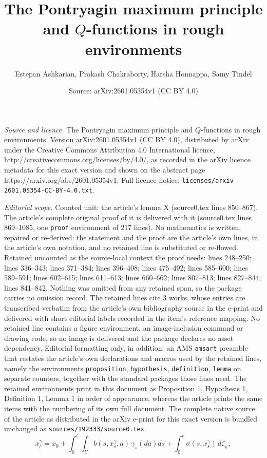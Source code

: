 \documentclass[10pt,a4paper]{amsart}
\title{The Pontryagin maximum principle and $Q$-functions in rough environments}
\author{Estepan Ashkarian, Prakash Chakraborty, Harsha Honnappa, Samy Tindel}
\date{Source: arXiv:2601.05354v1 (CC BY 4.0)}
\newcommand{\ga}{\gamma}
\newcommand{\iot}{\int_{0}^{t}}
\newcommand{\si}{\sigma}
\begin{document}
\maketitle

\noindent\emph{Source and licence.} The Pontryagin maximum principle and $Q$-functions in rough environments. Version arXiv:2601.05354v1 (CC BY 4.0), distributed by arXiv under the Creative Commons Attribution 4.0 International licence, http://creativecommons.org/licenses/by/4.0/, as recorded in the arXiv licence metadata for this exact version and shown on the abstract page https://arxiv.org/abs/2601.05354v1. Full licence notice: \texttt{licenses/arxiv-2601.05354-CC-BY-4.0.txt}.\par\smallskip

\noindent\textit{Editorial scope.} Counted unit: the article's lemma X (source0.tex lines 850--867). The article's complete original proof of it is delivered with it (source0.tex lines 869--1085, one \texttt{proof} environment of 217 lines). No mathematics is written, repaired or re-derived: the statement and the proof are the article's own lines, in the article's own notation, and no retained line is substituted or re-flowed.  Retained uncounted as the source-local context the proof needs: lines 248--250; lines 336--343; lines 371--384; lines 396--408; lines 475--492; lines 585--600; lines 589--591; lines 602--615; lines 611--613; lines 660--662; lines 807--813; lines 827--844; lines 841--842.  Nothing was omitted from any retained span, so the package carries no omission record.  The retained lines cite 3 works, whose entries are transcribed verbatim from the article's own bibliography source in the e-print and delivered with short editorial labels recorded in the item's reference mapping.  No retained line contains a figure environment, an image-inclusion command or drawing code, so no image is delivered and the package declares no asset dependency.  Editorial formatting only, in addition: an AMS \texttt{amsart} preamble that restates the article's own declarations and macros used by the retained lines, namely the environments \texttt{proposition}, \texttt{hypothesis}, \texttt{definition}, \texttt{lemma} on separate counters, together with the standard packages those lines need.  The retained environments print in this document as Proposition 1, Hypothesis 1, Definition 1, Lemma 1 in order of appearance, whereas the article prints the same items with the numbering of its own full document.  The complete native source of the article as distributed in the arXiv e-print for this exact version is bundled unchanged as \texttt{sources/192333/source0.tex}.
\begin{equation}\label{d1}
x_t^{\ga} = x_0 + \iot \int_{U} b(s, x_s^{\ga}, a) \, \ga_s(da) ds + \iot \si(s, x_s^{\ga}) \, d\zeta_s \, ,
\end{equation}
\end{document}

